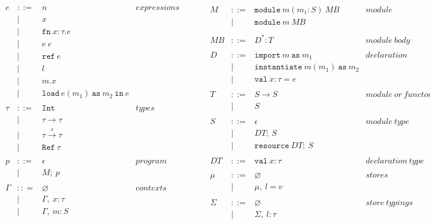 \documentclass{llncs}
\newcommand{\keywadj}[1]{\mathtt{#1}}
\newcommand{\keyw}[1]{\keywadj{#1}~}
\newcommand{\reftt}{\mathtt{ref}~}
\newcommand{\Reftt}{\mathtt{Ref}~}
\newcommand{\Inttt}{\mathtt{Int}~}
\begin{document}
\[
\begin{array}{lll}
\begin{array}{lllr}
e & ::= & n & expressions \\
& | & x\\
& | & \keyw{fn} x : \tau . e \\
& | & e~e\\
& | & \reftt e \\
& | & l \\
& | & m.x \\
& | & \keyw{load} e(m_1)~\keyw{as} m_2~\keyw{in} e \\
&&\\
\tau & ::= & \Inttt & types \\
& | & \tau \rightarrow \tau \\
& | & \tau \xrightarrow{s} \tau \\
& | & \Reftt \tau \\
&&\\
p & ::= & \epsilon & program\\
& | & M;~p\\
&&\\
\Gamma & :: = & \varnothing & contexts\\
& | & \Gamma,~x : \tau\\
& | & \Gamma,~m : S\\
\end{array}
& ~~~~~~
&
\begin{array}{lllr}
M & ::= & \keyw{module} m (m_1 : S)~MB & module \\
& | & \keyw{module} m~MB \\
&&\\
MB & ::= & D^* : T & module~body\\
&&\\
D & ::= & \keyw{import} m~\keyw{as} m_1 & declaration \\
& | & \keyw{instantiate} m(m_1)~\keyw{as} m_2 \\
& | & \keyw{val} x : \tau = e \\
&&\\
T & ::= & S \rightarrow S & module~or~functor~type\\
& | & S \\
&&\\
S & ::= & \epsilon & module~type \\
& | & DT;~S \\
& | & \keyw{resource} DT;~S \\
&&\\
DT & ::= & \keyw{val} x : \tau & declaration~type\\
&&\\
\mu & ::= & \varnothing & stores\\
& | & \mu,~l = v\\
&&\\
\Sigma & ::= & \varnothing & store~typings\\
& | & \Sigma,~l : \tau
\end{array}
\end{array}
\]
\end{document}
